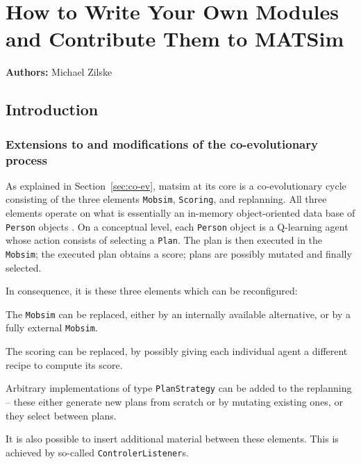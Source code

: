 \chapter{How to Write Your Own Modules and Contribute Them to MATSim}
\label{ch:extensionpoints}
\hfill \textbf{Authors:} Michael Zilske

\section{Introduction}
\label{sec:ownmodules-intro}

\subsection{Extensions to and modifications of the co-evolutionary process}

As explained in Section~\ref{sec:co-ev}, \acrshort{matsim} at its core is a co-evolutionary cycle consisting of the three elements \lstinline$Mobsim$, \lstinline$Scoring$, and replanning.  All three elements operate on what is essentially an in-memory object-oriented data base of \lstinline$Person$ objects \citep{RaneyNagel2006traf-framework}.  
%
On a conceptual level, each \lstinline$Person$ object is a Q-learning agent \citep[][Chapter~21]{RusselNorvig2010ArtificialIntelligence} whose action consists of selecting a \lstinline$Plan$.  The plan is then executed in the \lstinline$Mobsim$; the executed plan obtains a score; plans are possibly mutated and finally selected.

In consequence, it is these three elements which can be reconfigured:
\begin{compactitem}

\item The \lstinline$Mobsim$ can be replaced, either by an internally available alternative, or by a fully external \lstinline$Mobsim$.


\item The scoring can be replaced, by possibly giving each individual agent a different recipe to compute its score.

\item Arbitrary implementations of type \lstinline$PlanStrategy$ can be added to the replanning -- these either generate new plans from scratch or by mutating existing ones, or they select between plans.

\end{compactitem}
It is also possible to insert additional material between these elements.  This is achieved by so-called \lstinline$ControlerListener$s.

